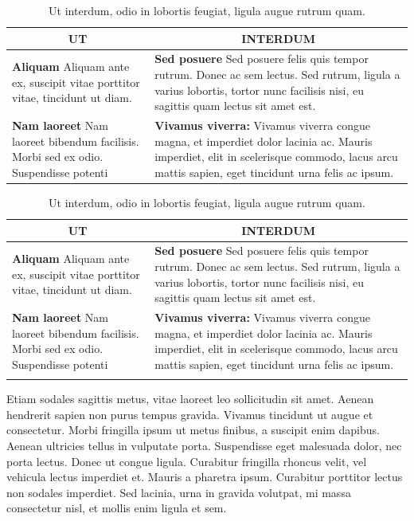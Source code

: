 \begin{table}[htbp]
\begin{center}
\begin{tabular}{p{7.5cm} | p{7.5cm}}
\multicolumn{1}{c}{\textbf{UT}} & \multicolumn{1}{c}{\textbf{INTERDUM}} \\
\hline
\textbf{Aliquam} Aliquam ante ex, suscipit vitae porttitor vitae, tincidunt ut diam. & \textbf{Sed posuere} Sed posuere felis quis tempor rutrum. Donec ac sem lectus. Sed rutrum, ligula a varius lobortis, tortor nunc facilisis nisi, eu sagittis quam lectus sit amet est. \\
\textbf{Nam laoreet} Nam laoreet bibendum facilisis. Morbi sed ex odio. Suspendisse potenti &  \textbf{Vivamus viverra:} Vivamus viverra congue magna, et imperdiet dolor lacinia ac. Mauris imperdiet, elit in scelerisque commodo, lacus arcu mattis sapien, eget tincidunt urna felis ac ipsum.\\
\end{tabular}
\end{center}
\caption{Ut interdum, odio in lobortis feugiat, ligula augue rutrum quam.}
\label{tab:UtInterdum}
\end{table}

\begin{longtable}{p{7.5cm} | p{7.5cm}}
\multicolumn{1}{c}{\textbf{UT}} & \multicolumn{1}{c}{\textbf{INTERDUM}} \\
\hline
\textbf{Aliquam} Aliquam ante ex, suscipit vitae porttitor vitae, tincidunt ut diam. & \textbf{Sed posuere} Sed posuere felis quis tempor rutrum. Donec ac sem lectus. Sed rutrum, ligula a varius lobortis, tortor nunc facilisis nisi, eu sagittis quam lectus sit amet est. \\
\textbf{Nam laoreet} Nam laoreet bibendum facilisis. Morbi sed ex odio. Suspendisse potenti &  \textbf{Vivamus viverra:} Vivamus viverra congue magna, et imperdiet dolor lacinia ac. Mauris imperdiet, elit in scelerisque commodo, lacus arcu mattis sapien, eget tincidunt urna felis ac ipsum.\\
\caption{Ut interdum, odio in lobortis feugiat, ligula augue rutrum quam.}
\label{tab:UtInterdum}
\end{longtable}


Etiam sodales sagittis metus, vitae laoreet leo sollicitudin sit amet. Aenean hendrerit sapien non purus tempus gravida. Vivamus tincidunt ut augue et consectetur. Morbi fringilla ipsum ut metus finibus, a suscipit enim dapibus. Aenean ultricies tellus in vulputate porta. Suspendisse eget malesuada dolor, nec porta lectus. Donec ut congue ligula. Curabitur fringilla rhoncus velit, vel vehicula lectus imperdiet et. Mauris a pharetra ipsum. Curabitur porttitor lectus non sodales imperdiet. Sed lacinia, urna in gravida volutpat, mi massa consectetur nisl, et mollis enim ligula et sem.\cite[S. 13 ff.]{20.02.1500}

